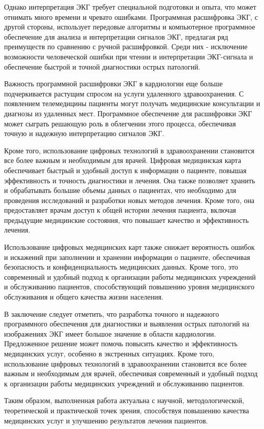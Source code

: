 Однако интерпретация ЭКГ требует специальной подготовки и опыта, что может отнимать много времени и чревато ошибками. Программная расшифровка ЭКГ, с другой стороны, использует передовые алгоритмы и компьютерное программное обеспечение для анализа и интерпретации сигналов ЭКГ, предлагая ряд преимуществ по сравнению с ручной расшифровкой. Среди них - исключение возможности человеческой ошибки при чтении и интерпретации ЭКГ-сигнала и обеспечение быстрой и точной диагностики острых патологий.

Важность программной расшифровки ЭКГ в кардиологии еще больше подчеркивается растущим спросом на услуги удаленного здравоохранения. С появлением телемедицины пациенты могут получать медицинские консультации и диагнозы из удаленных мест. Программное обеспечение для расшифровки ЭКГ может сыграть решающую роль в облегчении этого процесса, обеспечивая точную и надежную интерпретацию сигналов ЭКГ.

Кроме того, использование цифровых технологий в здравоохранении становится все более важным и необходимым для врачей. Цифровая медицинская карта обеспечивает быстрый и удобный доступ к информации о пациенте, повышая эффективность и точность диагностики и лечения. Она также позволяет хранить и обрабатывать большие объемы данных о пациентах, что необходимо для проведения исследований и разработки новых методов лечения. Кроме того, она предоставляет врачам доступ к общей истории лечения пациента, включая предыдущие медицинские состояния, что повышает качество и эффективность лечения.

Использование цифровых медицинских карт также снижает вероятность ошибок и искажений при заполнении и хранении информации о пациенте, обеспечивая безопасность и конфиденциальность медицинских данных. Кроме того, это современный и удобный подход к организации работы медицинских учреждений и обслуживанию пациентов, способствующий повышению уровня медицинского обслуживания и общего качества жизни населения.

В заключение следует отметить, что разработка точного и надежного программного обеспечения для диагностики и выявления острых патологий на изображениях ЭКГ имеет большое значение в области кардиологии. Предложенное решение может помочь повысить качество и эффективность медицинских услуг, особенно в экстренных ситуациях. Кроме того, использование цифровых технологий в здравоохранении становится все более важным и необходимым для врачей, обеспечивая современный и удобный подход к организации работы медицинских учреждений и обслуживанию пациентов. 

Таким образом, выполненная работа актуальна с научной, методологической, теоретической и практической точек зрения, способствуя повышению качества медицинских услуг и улучшению результатов лечения пациентов.

